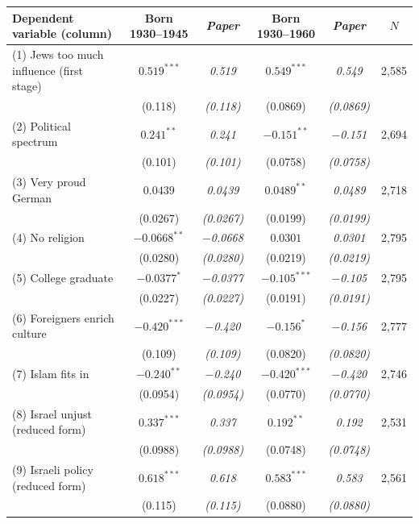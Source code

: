 \begin{tabular}{lccccc}
\toprule
Dependent variable (column) & Born 1930--1945 & \textit{Paper} & Born 1930--1960 & \textit{Paper} & $N$ \\
\midrule
(1) Jews too much influence (first stage) & $0.519^{***}$ & \textit{0.519} & $0.549^{***}$ & \textit{0.549} & 2,585 \\
 & (0.118) & \textit{(0.118)} & (0.0869) & \textit{(0.0869)} & \\
(2) Political spectrum & $0.241^{**}$ & \textit{0.241} & $-0.151^{**}$ & \textit{$-$0.151} & 2,694 \\
 & (0.101) & \textit{(0.101)} & (0.0758) & \textit{(0.0758)} & \\
(3) Very proud German & $0.0439$ & \textit{0.0439} & $0.0489^{**}$ & \textit{0.0489} & 2,718 \\
 & (0.0267) & \textit{(0.0267)} & (0.0199) & \textit{(0.0199)} & \\
(4) No religion & $-0.0668^{**}$ & \textit{$-$0.0668} & $0.0301$ & \textit{0.0301} & 2,795 \\
 & (0.0280) & \textit{(0.0280)} & (0.0219) & \textit{(0.0219)} & \\
(5) College graduate & $-0.0377^{*}$ & \textit{$-$0.0377} & $-0.105^{***}$ & \textit{$-$0.105} & 2,795 \\
 & (0.0227) & \textit{(0.0227)} & (0.0191) & \textit{(0.0191)} & \\
(6) Foreigners enrich culture & $-0.420^{***}$ & \textit{$-$0.420} & $-0.156^{*}$ & \textit{$-$0.156} & 2,777 \\
 & (0.109) & \textit{(0.109)} & (0.0820) & \textit{(0.0820)} & \\
(7) Islam fits in & $-0.240^{**}$ & \textit{$-$0.240} & $-0.420^{***}$ & \textit{$-$0.420} & 2,746 \\
 & (0.0954) & \textit{(0.0954)} & (0.0770) & \textit{(0.0770)} & \\
(8) Israel unjust (reduced form) & $0.337^{***}$ & \textit{0.337} & $0.192^{**}$ & \textit{0.192} & 2,531 \\
 & (0.0988) & \textit{(0.0988)} & (0.0748) & \textit{(0.0748)} & \\
(9) Israeli policy (reduced form) & $0.618^{***}$ & \textit{0.618} & $0.583^{***}$ & \textit{0.583} & 2,561 \\
 & (0.115) & \textit{(0.115)} & (0.0880) & \textit{(0.0880)} & \\
\bottomrule
\end{tabular}
